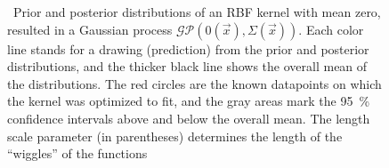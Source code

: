 \begin{figure}[t]
	\centering
	\hfill %
	\caption[Prior and posterior of an RBF kernel]
		{\hspace{-0.18cm}\footnotemark\ 
		Prior and posterior distributions of an RBF kernel with mean zero, resulted in a Gaussian process $\mathcal{GP}\left( 0 (\vec{x}), \Sigma(\vec{x}) \right)$.
		Each color line stands for a drawing (prediction) from the prior and posterior distributions, and the thicker black line shows the overall mean of the distributions.
		The red circles are the known datapoints on which the kernel was optimized to fit, and the gray areas mark the \SI{95}{\percent} confidence intervals above and below the overall mean.
		The length scale parameter (in parentheses) determines the length of the \enquote{wiggles} of the functions}
	\label{fig:RBF_prior_posterior}
\end{figure}


